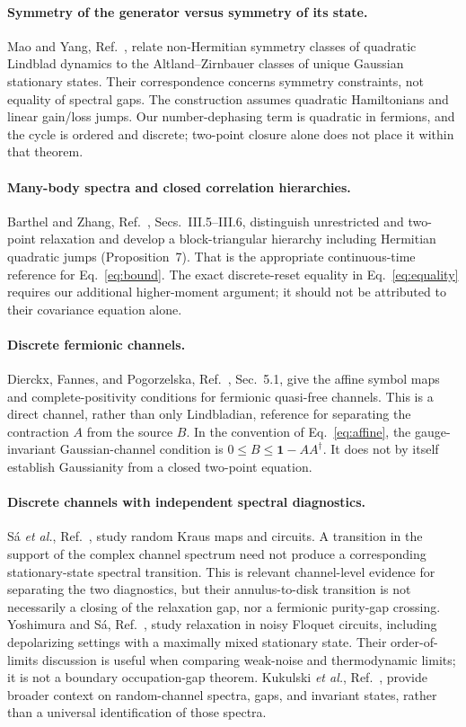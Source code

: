\documentclass[aps,prb,twocolumn,nofootinbib,superscriptaddress]{revtex4-2}
\newcommand{\id}{\mathbf{1}}
\begin{document}
\paragraph{Symmetry of the generator versus symmetry of its state.}
Mao and Yang, Ref.~\cite{Mao}, relate non-Hermitian symmetry classes
of quadratic Lindblad dynamics to the Altland--Zirnbauer classes of
unique Gaussian stationary states. Their correspondence concerns symmetry
constraints, not equality of spectral gaps. The construction assumes
quadratic Hamiltonians and linear gain/loss jumps. Our number-dephasing
term is quadratic in fermions, and the cycle is ordered and discrete;
two-point closure alone does not place it within that theorem.

\paragraph{Many-body spectra and closed correlation hierarchies.}
Barthel and Zhang, Ref.~\cite{BZ}, Secs.~III.5--III.6, distinguish
unrestricted and two-point relaxation and develop a block-triangular
hierarchy including Hermitian quadratic jumps (Proposition~7).
That is the appropriate continuous-time reference for
Eq.~\eqref{eq:bound}. The exact discrete-reset equality in
Eq.~\eqref{eq:equality} requires our additional higher-moment argument;
it should not be attributed to their covariance equation alone.

\paragraph{Discrete fermionic channels.}
Dierckx, Fannes, and Pogorzelska, Ref.~\cite{DFP}, Sec.~5.1,
give the affine symbol maps and complete-positivity conditions for
fermionic quasi-free channels. This is a direct channel, rather than
only Lindbladian, reference for separating the contraction $A$ from
the source $B$. In the convention of Eq.~\eqref{eq:affine}, the
gauge-invariant Gaussian-channel condition is
$0\le B\le\id-AA^\dagger$. It does not by itself establish
Gaussianity from a closed two-point equation.

\paragraph{Discrete channels with independent spectral diagnostics.}
S\'a \emph{et al.}, Ref.~\cite{Sa}, study random Kraus maps and circuits.
A transition in the support of the complex channel spectrum need not
produce a corresponding stationary-state spectral transition.
This is relevant channel-level evidence for separating the two
diagnostics, but their annulus-to-disk transition is not necessarily
a closing of the relaxation gap, nor a fermionic purity-gap crossing.
Yoshimura and S\'a, Ref.~\cite{YS}, study relaxation in noisy Floquet
circuits, including depolarizing settings with a maximally mixed
stationary state. Their order-of-limits discussion is useful when
comparing weak-noise and thermodynamic limits; it is not a boundary
occupation-gap theorem. Kukulski \emph{et al.}, Ref.~\cite{Kukulski},
provide broader context on random-channel spectra, gaps, and invariant
states, rather than a universal identification of those spectra.
\end{document}
